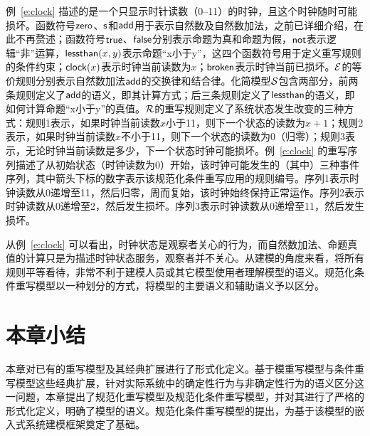 例~\ref{e:clock} 描述的是一个只显示时针读数（0--11）的时钟，且这个时钟随时可能损坏。函数符号$\operatorname{\mathsf{zero}}$、$\operatorname{\mathsf{s}}$和$\operatorname{\mathsf{add}}$用于表示自然数及自然数加法，之前已详细介绍，在此不再赘述；函数符号$\operatorname{\mathsf{true}}$、$\operatorname{\mathsf{false}}$分别表示命题为真和命题为假，$\operatorname{\mathsf{not}}$表示逻辑“非”运算，$\operatorname{\mathsf{lessthan}}(x,y)$表示命题“x小于y”，这四个函数符号用于定义重写规则的条件约束；$\operatorname{\mathsf{clock}}(x)$表示时钟当前读数为$x$；$\operatorname{\mathsf{broken}}$表示时钟当前已损坏。$\mathcal{E}$的等价规则分别表示自然数加法$\operatorname{\mathsf{add}}$的交换律和结合律。化简模型$\mathcal{S}$包含两部分，前两条规则定义了$\operatorname{\mathsf{add}}$的语义，即其计算方式；后三条规则定义了$\operatorname{\mathsf{lessthan}}$的语义，即如何计算命题“x小于y”的真值。$\mathcal{R}$的重写规则定义了系统状态发生改变的三种方式：规则1表示，如果时钟当前读数$x$小于11，则下一个状态的读数为$x+1$；规则2表示，如果时钟当前读数$x$不小于11，则下一个状态的读数为0（归零）；规则3表示，无论时钟当前读数是多少，下一个状态时钟可能损坏。例~\ref{e:clock} 的重写序列描述了从初始状态（时钟读数为0）开始，该时钟可能发生的（其中）三种事件序列，其中箭头下标的数字表示该规范化条件重写应用的规则编号。序列1表示时钟读数从0递增至11，然后归零，周而复始，该时钟始终保持正常运作。序列2表示时钟读数从0递增至2，然后发生损坏。序列3表示时钟读数从0递增至11，然后发生损坏。

从例~\ref{e:clock} 可以看出，时钟状态是观察者关心的行为，而自然数加法、命题真值的计算只是为描述时钟状态服务，观察者并不关心。从建模的角度来看，将所有规则平等看待，非常不利于建模人员或其它模型使用者理解模型的语义。规范化条件重写模型以一种划分的方式，将模型的主要语义和辅助语义予以区分。

\section{本章小结}

本章对已有的重写模型及其经典扩展进行了形式化定义。基于模重写模型与条件重写模型这些经典扩展，针对实际系统中的确定性行为与非确定性行为的语义区分这一问题，本章提出了规范化重写模型及规范化条件重写模型，并对其进行了严格的形式化定义，明确了模型的语义。规范化条件重写模型的提出，为基于该模型的嵌入式系统建模框架奠定了基础。

